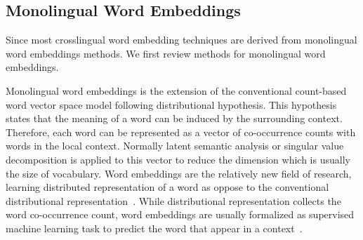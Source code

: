 \documentclass[12pt,twoside,final,hidelinks]{ltthesis}
\theoremstyle{definition}
\begin{document}
\subsection{Monolingual Word Embeddings}
Since most crosslingual word embedding techniques are derived from monolingual word embeddings methods. We first  review methods for monolingual word embeddings. 

Monolingual word embeddings is the extension of the conventional count-based word vector space model following distributional hypothesis. This hypothesis states that the meaning of a word can be induced by the surrounding context. Therefore, each word can be represented as a vector of co-occurrence counts with words in the local context. Normally latent semantic analysis or singular value decomposition is applied to this vector to reduce the dimension which is usually the size of vocabulary. Word embeddings are the relatively new field of research, learning distributed representation of a word as oppose to the conventional distributional representation~\cite{blacoe-lapata:2012:EMNLP-CoNLL,baroni-dinu-kruszewski:2014:P14-1}. While distributional representation collects the word co-occurrence count, word embeddings are usually formalized as supervised machine learning task to predict the word that appear in a context~\cite{Collobert:2008,mikolov-yih-zweig:2013:NAACL-HLT,Bengio:2003:NPL:944919.944966,Turian:2010:WRS:1858681.1858721,Huang:2012:IWR:2390524.2390645,pennington2014glove}.
\end{document}
